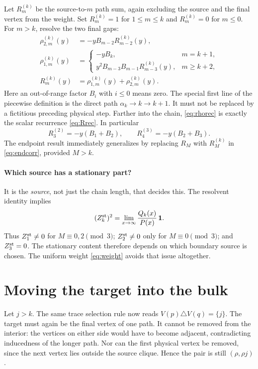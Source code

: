 \documentclass[11pt,a4paper]{article}
\newcommand{\one}{\mathbf 1}
\begin{document}
Let $R_m^{(k)}$ be the source-to-$m$ path sum, again excluding the source and the final vertex from the weight. Set $R_m^{(k)}=1$ for $1\le m\le k$ and $R_m^{(k)}=0$ for $m\le0$. For $m>k$, resolve the two final gaps:
\begin{equation}
 \begin{aligned}
 \rho_{2,m}^{(k)}(y)&=-yB_{m-2}R_{m-2}^{(k)}(y),\\
 \rho_{1,m}^{(k)}(y)&=
 \begin{cases}
 -yB_k,&m=k+1,\\
 y^2B_{m-3}B_{m-1}R_{m-3}^{(k)}(y),&m\ge k+2,
 \end{cases}\\
 R_m^{(k)}(y)&=\rho_{1,m}^{(k)}(y)+\rho_{2,m}^{(k)}(y).
 \end{aligned}
 \label{eq:rhorec}
\end{equation}
Here an out-of-range factor $B_i$ with $i\le0$ means zero. The special first line of the piecewise definition is the direct path $\alpha_k\to k\to k+1$. It must not be replaced by a fictitious preceding physical step. Farther into the chain, \eqref{eq:rhorec} is exactly the scalar recurrence \eqref{eq:Rrec}. In particular
\begin{equation}
 R_3^{(2)}=-y(B_1+B_2),\qquad
 R_4^{(3)}=-y(B_2+B_3).
\end{equation}
The endpoint result immediately generalizes by replacing $R_M$ with $R_M^{(k)}$ in \eqref{eq:endcorr}, provided $M>k$.

\paragraph{Which source has a stationary part?}
It is the \emph{source}, not just the chain length, that decides this. The resolvent identity implies~\cite{FPV}
\begin{equation}
 (Z_k^{\rm st})^2=\lim_{x\to\infty}\frac{Q_k(x)}{P(x)}\,\one.
 \label{eq:stationary}
\end{equation}
Thus $Z_1^{\rm st}\ne0$ for $M\equiv0,2\pmod3$; $Z_2^{\rm st}\ne0$ only for $M\equiv0\pmod3$; and $Z_3^{\rm st}=0$. The stationary content therefore depends on which boundary source is chosen. The uniform weight \eqref{eq:weight} avoids that issue altogether.

\section{Moving the target into the bulk}
Let $j>k$. The same trace selection rule now reads
$V(p)\triangle V(q)=\{j\}$. The target must again be the final vertex of one path. It cannot be removed from the interior: the vertices on either side would have to become adjacent, contradicting inducedness of the longer path. Nor can the first physical vertex be removed, since the next vertex lies outside the source clique. Hence the pair is still $(\rho,\rho j)$.
\end{document}
